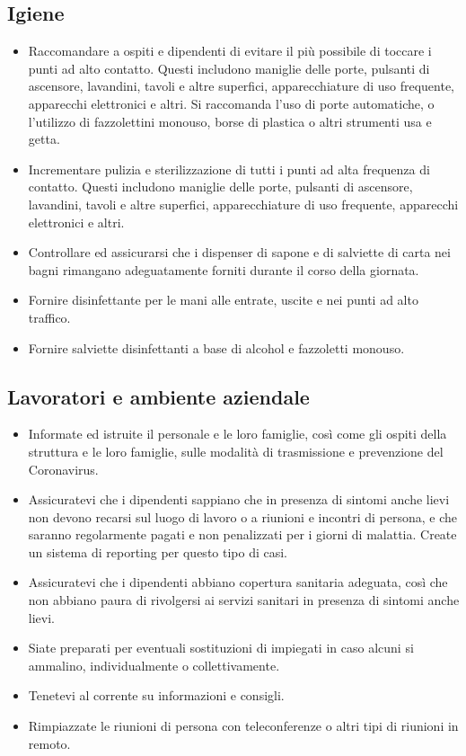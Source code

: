 \documentclass[onecolumn,journal]{IEEEtran}
\begin{document}
\begin{multicols}{2}
\begin{itemize}
\end{itemize}

\subsection*{Igiene}

\begin{itemize}
\item Raccomandare a ospiti e dipendenti di evitare il più possibile di toccare i punti ad alto contatto. Questi includono maniglie delle porte, pulsanti di ascensore, lavandini, tavoli e altre superfici, apparecchiature di uso frequente, apparecchi elettronici e altri. Si raccomanda l’uso di porte automatiche, o l’utilizzo di fazzolettini monouso, borse di plastica o altri strumenti usa e getta.
\item Incrementare pulizia e sterilizzazione di tutti i punti ad alta frequenza di contatto. Questi includono maniglie delle porte, pulsanti di ascensore, lavandini, tavoli e altre superfici, apparecchiature di uso frequente, apparecchi elettronici e altri.
\item Controllare ed assicurarsi che i dispenser di sapone e di salviette di carta nei bagni rimangano adeguatamente forniti durante il corso della giornata.
\item Fornire disinfettante per le mani alle entrate, uscite e nei punti ad alto traffico.
\item Fornire salviette disinfettanti a base di alcohol e fazzoletti monouso.

\end{itemize}

\subsection*{Lavoratori e ambiente aziendale}

\begin{itemize}
\item Informate ed istruite il personale e le loro famiglie, così come gli ospiti della struttura e le loro famiglie, sulle modalità di trasmissione e prevenzione del Coronavirus.
\item Assicuratevi che i dipendenti sappiano che in presenza di sintomi anche lievi non devono recarsi sul luogo di lavoro o a riunioni e incontri di persona, e che saranno regolarmente pagati e non penalizzati per i giorni di malattia. Create un sistema di reporting per questo tipo di casi.
\item Assicuratevi che i dipendenti abbiano copertura sanitaria adeguata, così che non abbiano paura di rivolgersi ai servizi sanitari in presenza di sintomi anche lievi.
\item Siate preparati per eventuali sostituzioni di impiegati in caso alcuni si ammalino, individualmente o collettivamente.
\item Tenetevi al corrente su informazioni e consigli.
\item Rimpiazzate le riunioni di persona con teleconferenze o altri tipi di riunioni in remoto.


\end{itemize}
\end{multicols}
\end{document}

